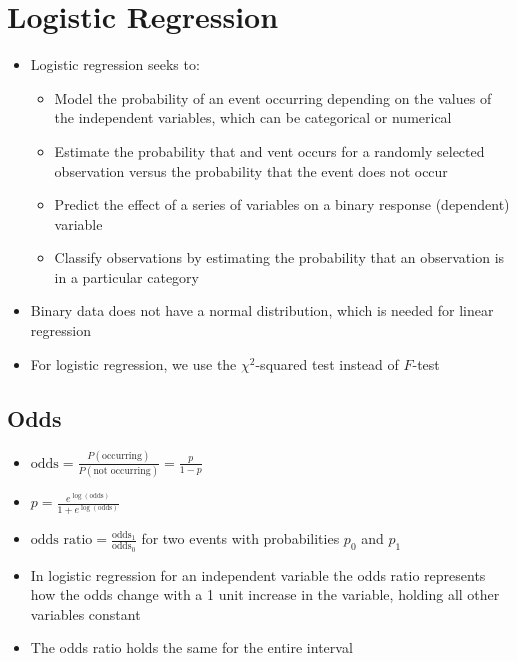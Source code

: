 \documentclass{article}
\begin{document}
\section{Logistic Regression}

\begin{itemize}
    \item Logistic regression seeks to:
    \begin{itemize}
        \item Model the probability of an event occurring depending on the values of the independent variables, which can be categorical or numerical
        \item Estimate the probability that and vent occurs for a randomly selected observation versus the probability that the event does not occur
        \item Predict the effect of a series of variables on a binary response (dependent) variable
        \item Classify observations by estimating the probability that an observation is in a particular category
    \end{itemize}
    \item Binary data does not have a normal distribution, which is needed for linear regression
    \item For logistic regression, we use the $\chi^2$-squared test instead of $F$-test
\end{itemize}

\subsection{Odds}

\begin{itemize}
    \item $\text{odds}=\frac{P(\text{occurring})}{P(\text{not occurring})}=\frac{p}{1-p}$
    \item $p=\frac{e^{\log(\text{odds})}}{1+e^{\log(\text{odds})}}$
    \item $\text{odds ratio}=\frac{\text{odds}_1}{\text{odds}_0}$ for two events with probabilities $p_0$ and $p_1$
    \item In logistic regression for an independent variable the odds ratio represents how the odds change with a 1 unit increase in the variable, holding all other variables constant
    \item The odds ratio holds the same for the entire interval
\end{itemize}
\end{document}
